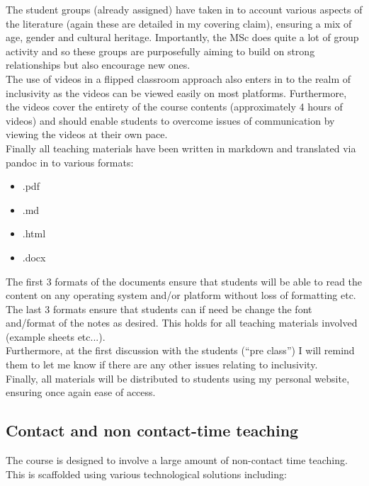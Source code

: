 \documentclass[a4paper,12pt]{article}
\begin{document}
The student groups (already assigned) have taken in to account various aspects of the literature (again these are detailed in my covering claim), ensuring a mix of age, gender and cultural heritage. Importantly, the MSc does quite a lot of group activity and so these groups are purposefully aiming to build on strong relationships but also encourage new ones.\\

The use of videos in a flipped classroom approach also enters in to the realm of inclusivity as the videos can be viewed easily on most platforms. Furthermore, the videos cover the entirety of the course contents (approximately 4 hours of videos) and should enable students to overcome issues of communication by viewing the videos at their own pace.\\

Finally all teaching materials have been written in markdown and translated via pandoc in to various formats:

\begin{itemize}
    \item .pdf
    \item .md
    \item .html
    \item .docx
\end{itemize}

The first 3 formats of the documents ensure that students will be able to read the content on any operating system and/or platform without loss of formatting etc. The last 3 formats ensure that students can if need be change the font and/format of the notes as desired.  This holds for all teaching materials involved (example sheets etc...).  \\

Furthermore, at the first discussion with the students (``pre class'') I will remind them to let me know if there are any other issues relating to inclusivity.\\

Finally, all materials will be distributed to students using my personal website, ensuring once again ease of access.

\subsection{Contact and non contact-time teaching}

The course is designed to involve a large amount of non-contact time teaching. This is scaffolded using various technological solutions including:
\end{document}
